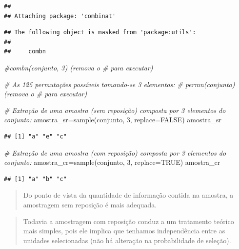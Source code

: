 \documentclass[
]{book}
\newenvironment{Shaded}{\begin{snugshade}}{\end{snugshade}}
\newcommand{\AttributeTok}[1]{\textcolor[rgb]{0.77,0.63,0.00}{#1}}
\newcommand{\CommentTok}[1]{\textcolor[rgb]{0.56,0.35,0.01}{\textit{#1}}}
\newcommand{\ConstantTok}[1]{\textcolor[rgb]{0.00,0.00,0.00}{#1}}
\newcommand{\DecValTok}[1]{\textcolor[rgb]{0.00,0.00,0.81}{#1}}
\newcommand{\FunctionTok}[1]{\textcolor[rgb]{0.00,0.00,0.00}{#1}}
\newcommand{\NormalTok}[1]{#1}
\newcommand{\OtherTok}[1]{\textcolor[rgb]{0.56,0.35,0.01}{#1}}
\begin{document}
\begin{verbatim}
## 
## Attaching package: 'combinat'
\end{verbatim}

\begin{verbatim}
## The following object is masked from 'package:utils':
## 
##     combn
\end{verbatim}

\begin{Shaded}
\begin{Highlighting}[]
\CommentTok{\#combn(conjunto, 3) (remova o \# para executar)}

\CommentTok{\# As 125 permutações possíveis tomando{-}se 3 elementos:}
\CommentTok{\# permn(conjunto) (remova o \# para executar)}

\CommentTok{\# Extração de uma amostra (sem reposição) composta por 3 elementos do conjunto:}
\NormalTok{amostra\_sr}\OtherTok{=}\FunctionTok{sample}\NormalTok{(conjunto, }\DecValTok{3}\NormalTok{, }\AttributeTok{replace=}\ConstantTok{FALSE}\NormalTok{)}
\NormalTok{amostra\_sr}
\end{Highlighting}
\end{Shaded}

\begin{verbatim}
## [1] "a" "e" "c"
\end{verbatim}

\begin{Shaded}
\begin{Highlighting}[]
\CommentTok{\# Extração de uma amostra (com reposição) composta por 3 elementos do conjunto:}
\NormalTok{amostra\_cr}\OtherTok{=}\FunctionTok{sample}\NormalTok{(conjunto, }\DecValTok{3}\NormalTok{, }\AttributeTok{replace=}\ConstantTok{TRUE}\NormalTok{)}
\NormalTok{amostra\_cr}
\end{Highlighting}
\end{Shaded}

\begin{verbatim}
## [1] "a" "b" "c"
\end{verbatim}

\hfill\break

\begin{quote}
Do ponto de vista da quantidade de informação contida na amostra, a amostragem sem reposição é mais adequada.
\end{quote}

\hfill\break

\begin{quote}
Todavia a amostragem com reposição conduz a um tratamento teórico mais simples, pois ele implica que tenhamos independência entre as unidades selecionadas (não há alteração na probabilidade de seleção).
\end{quote}
\end{document}
